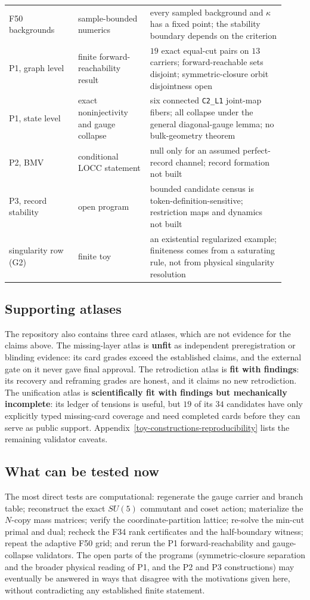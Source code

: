 \begin{longtable}[]{@{}p{0.23\linewidth}p{0.24\linewidth}p{0.45\linewidth}@{}}
F50 backgrounds & sample-bounded numerics & every sampled background and \(\kappa\) has a fixed point; the stability
boundary depends on the criterion\\
P1, graph level & finite forward-reachability result & \(19\) exact equal-cut pairs on \(13\) carriers; forward-reachable
sets disjoint; symmetric-closure orbit disjointness open\\
P1, state level & exact noninjectivity and gauge collapse & six connected \texttt{C2\_L1} joint-map fibers; all collapse
under the general diagonal-gauge lemma; no bulk-geometry theorem\\
P2, BMV & conditional LOCC statement & null only for an assumed perfect-record channel; record formation not built\\
P3, record stability & open program & bounded candidate census is token-definition-sensitive; restriction maps and
dynamics not built\\
singularity row (G2) & finite toy & an existential regularized example; finiteness comes from a saturating rule, not from
physical singularity resolution\\
\bottomrule
\end{longtable}

\subsection{Supporting atlases}

The repository also contains three card atlases, which are not evidence for the claims above. The missing-layer
atlas is \textbf{unfit} as independent preregistration or blinding evidence: its card grades exceed the established
claims, and the external gate on it never gave final approval. The retrodiction atlas is \textbf{fit with findings}:
its recovery and reframing grades are honest, and it claims no new retrodiction. The unification atlas is
\textbf{scientifically fit with findings but mechanically incomplete}: its ledger of tensions is useful, but \(19\) of
its \(34\) candidates have only explicitly typed missing-card coverage and need completed cards before they can serve
as public support. Appendix~\ref{toy-constructions-reproducibility} lists the remaining validator caveats.

\subsection{What can be tested now}

The most direct tests are computational: regenerate the gauge carrier and branch table; reconstruct the exact
\(SU(5)\) commutant and coset action; materialize the \(N\)-copy mass matrices; verify the coordinate-partition
lattice; re-solve the min-cut primal and dual; recheck the F34 rank certificates and the half-boundary witness; repeat
the adaptive F50 grid; and rerun the P1 forward-reachability and gauge-collapse validators. The open parts of the
programs (symmetric-closure separation and the broader physical reading of P1, and the P2 and P3 constructions) may
eventually be answered in ways that disagree with the motivations given here, without contradicting any established
finite statement.
